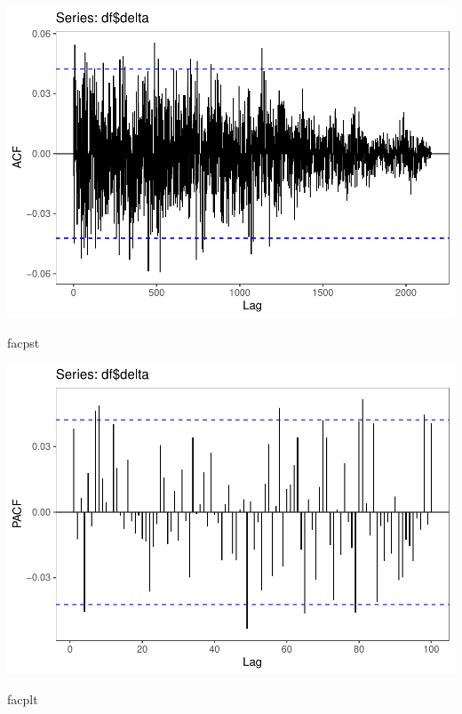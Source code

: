 \documentclass[11pt, a4paper]{report}
\newenvironment{Shaded}{\begin{snugshade}}{\end{snugshade}}
\newcommand{\NormalTok}[1]{#1}
\theoremstyle{plain}
\theoremstyle{plain}
\theoremstyle{remark}
\begin{document}
\begin{center}\includegraphics{Econo2_P1_files/figure-latex/plots-6} \end{center}

\begin{Shaded}
\begin{Highlighting}[]
\NormalTok{facpst}
\end{Highlighting}
\end{Shaded}

\begin{center}\includegraphics{Econo2_P1_files/figure-latex/plots-7} \end{center}

\begin{Shaded}
\begin{Highlighting}[]
\NormalTok{facplt}
\end{Highlighting}
\end{Shaded}
\end{document}
